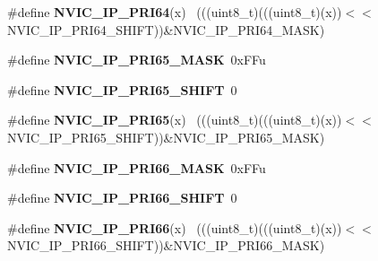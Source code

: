 \begin{DoxyCompactItemize}
\item 
\hypertarget{group___n_v_i_c___register___masks_ga91fbea104cffe6f89e8e086fa15673a2}{}\#define {\bfseries N\+V\+I\+C\+\_\+\+I\+P\+\_\+\+P\+R\+I64}(x)                                              ~(((uint8\+\_\+t)(((uint8\+\_\+t)(x))$<$$<$N\+V\+I\+C\+\_\+\+I\+P\+\_\+\+P\+R\+I64\+\_\+\+S\+H\+I\+F\+T))\&N\+V\+I\+C\+\_\+\+I\+P\+\_\+\+P\+R\+I64\+\_\+\+M\+A\+S\+K)\label{group___n_v_i_c___register___masks_ga91fbea104cffe6f89e8e086fa15673a2}

\item 
\hypertarget{group___n_v_i_c___register___masks_ga53cac130da577cc67e476869de6a7e2f}{}\#define {\bfseries N\+V\+I\+C\+\_\+\+I\+P\+\_\+\+P\+R\+I65\+\_\+\+M\+A\+S\+K}~0x\+F\+Fu\label{group___n_v_i_c___register___masks_ga53cac130da577cc67e476869de6a7e2f}

\item 
\hypertarget{group___n_v_i_c___register___masks_gacb02af802ed0a121a55dad817a8c5108}{}\#define {\bfseries N\+V\+I\+C\+\_\+\+I\+P\+\_\+\+P\+R\+I65\+\_\+\+S\+H\+I\+F\+T}~0\label{group___n_v_i_c___register___masks_gacb02af802ed0a121a55dad817a8c5108}

\item 
\hypertarget{group___n_v_i_c___register___masks_ga1e61544f290b30e488bb5fdcc12c8772}{}\#define {\bfseries N\+V\+I\+C\+\_\+\+I\+P\+\_\+\+P\+R\+I65}(x)                                              ~(((uint8\+\_\+t)(((uint8\+\_\+t)(x))$<$$<$N\+V\+I\+C\+\_\+\+I\+P\+\_\+\+P\+R\+I65\+\_\+\+S\+H\+I\+F\+T))\&N\+V\+I\+C\+\_\+\+I\+P\+\_\+\+P\+R\+I65\+\_\+\+M\+A\+S\+K)\label{group___n_v_i_c___register___masks_ga1e61544f290b30e488bb5fdcc12c8772}

\item 
\hypertarget{group___n_v_i_c___register___masks_gaba1c5a6943b18240542c4a7f0bccb872}{}\#define {\bfseries N\+V\+I\+C\+\_\+\+I\+P\+\_\+\+P\+R\+I66\+\_\+\+M\+A\+S\+K}~0x\+F\+Fu\label{group___n_v_i_c___register___masks_gaba1c5a6943b18240542c4a7f0bccb872}

\item 
\hypertarget{group___n_v_i_c___register___masks_gab45fa71f8c1c76e7e82b45672b156f82}{}\#define {\bfseries N\+V\+I\+C\+\_\+\+I\+P\+\_\+\+P\+R\+I66\+\_\+\+S\+H\+I\+F\+T}~0\label{group___n_v_i_c___register___masks_gab45fa71f8c1c76e7e82b45672b156f82}

\item 
\hypertarget{group___n_v_i_c___register___masks_gae5fa09a6a892e2179df754222c824de6}{}\#define {\bfseries N\+V\+I\+C\+\_\+\+I\+P\+\_\+\+P\+R\+I66}(x)                                              ~(((uint8\+\_\+t)(((uint8\+\_\+t)(x))$<$$<$N\+V\+I\+C\+\_\+\+I\+P\+\_\+\+P\+R\+I66\+\_\+\+S\+H\+I\+F\+T))\&N\+V\+I\+C\+\_\+\+I\+P\+\_\+\+P\+R\+I66\+\_\+\+M\+A\+S\+K)\label{group___n_v_i_c___register___masks_gae5fa09a6a892e2179df754222c824de6}


\end{DoxyCompactItemize}
